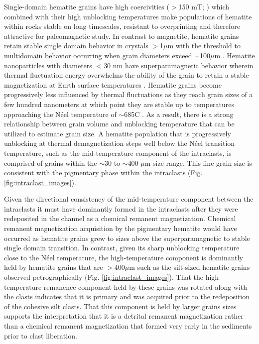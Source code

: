 \documentclass[11pt,letterpaper]{article}
\begin{document}
Single-domain hematite grains have high coercivities ($>$150 mT; \citealp{Ozdemir2014a}) which combined with their high unblocking temperatures make populations of hematite within rocks stable on long timescales, resistant to overprinting and therefore attractive for paleomagnetic study. In contrast to magnetite, hematite grains retain stable single domain behavior in crystals $>$1$\mu$m with the threshold to multidomain behavior occurring when grain diameters exceed $\sim$100$\mu$m \citep{Kletetschka2002a, Ozdemir2014a}. Hematite nanoparticles with diameters $<$30 nm have superparamagnetic behavior wherein thermal fluctuation energy overwhelms the ability of the grain to retain a stable magnetization at Earth surface temperatures \citep{Ozdemir2014a}. Hematite grains become progressively less influenced by thermal fluctuations as they reach grain sizes of a few hundred nanometers at which point they are stable up to temperatures approaching the N\'eel temperature of $\sim$685\textdegree C \citep{Swanson-Hysell2011a, Ozdemir2014a}. As a result, there is a strong relationship between grain volume and unblocking temperature that can be utilized to estimate grain size. A hematite population that is progressively unblocking at thermal demagnetization steps well below the N\'eel transition temperature, such as the mid-temperature component of the intraclasts, is comprised of grains within the $\sim$30 to $\sim$400 $\mu$m size range. This fine-grain size is consistent with the pigmentary phase within the intraclasts (Fig. \ref{fig:intraclast_images}). 

Given the directional consistency of the mid-temperature component between the intraclasts it must have dominantly formed in the intraclasts after they were redeposited in the channel as a chemical remanent magnetization. Chemical remanent magnetization acquisition by the pigmentary hematite would have occurred as hematite grains grew to sizes above the superparamagnetic to stable single domain transition. In contrast, given its sharp unblocking temperature close to the N\'eel temperature, the high-temperature component is dominantly held by hematite grains that are $>$400$\mu$m such as the silt-sized hematite grains observed petrographically (Fig. \ref{fig:intraclast_images}). That the high-temperature remanence component held by these grains was rotated along with the clasts indicates that it is primary and was acquired prior to the redeposition of the cohesive silt clasts. That this component is held by larger grains sizes supports the interpretation that it is a detrital remanent magnetization rather than a chemical remanent magnetization that formed very early in the sediments prior to clast liberation.
\end{document}
